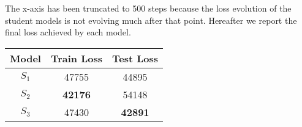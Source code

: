 The x-axis has been truncated to 500 steps because the loss evolution of the
student models is not evolving much after that point. Hereafter we report the final
loss achieved by each model.

\begin{table}[H]
    \centering
    \begin{tabular}{|c|c|c|}
        \hline
        Model & Train Loss & Test Loss \\
        \hline
        $S_1$ & 47755 & 44895 \\
        $S_2$ & \textbf{42176} & 54148 \\
        $S_3$ & 47430 & \textbf{42891} \\
        \hline
    \end{tabular}
\end{table}